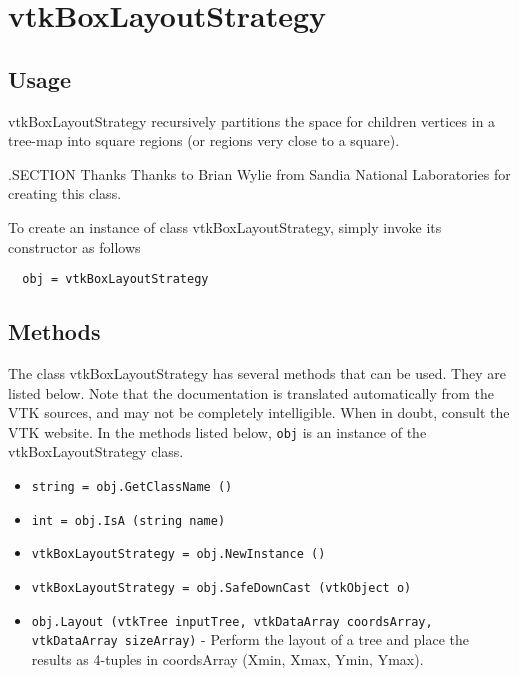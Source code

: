 \section{vtkBoxLayoutStrategy}

\subsection{Usage}

 vtkBoxLayoutStrategy recursively partitions the space for children vertices
 in a tree-map into square regions (or regions very close to a square).

 .SECTION Thanks
 Thanks to Brian Wylie from Sandia National Laboratories for creating this class.

To create an instance of class vtkBoxLayoutStrategy, simply
invoke its constructor as follows
\begin{verbatim}
  obj = vtkBoxLayoutStrategy
\end{verbatim}
\subsection{Methods}

The class vtkBoxLayoutStrategy has several methods that can be used.
  They are listed below.
Note that the documentation is translated automatically from the VTK sources,
and may not be completely intelligible.  When in doubt, consult the VTK website.
In the methods listed below, \verb|obj| is an instance of the vtkBoxLayoutStrategy class.
\begin{itemize}
\item  \verb|string = obj.GetClassName ()|

\item  \verb|int = obj.IsA (string name)|

\item  \verb|vtkBoxLayoutStrategy = obj.NewInstance ()|

\item  \verb|vtkBoxLayoutStrategy = obj.SafeDownCast (vtkObject o)|

\item  \verb|obj.Layout (vtkTree inputTree, vtkDataArray coordsArray, vtkDataArray sizeArray)| -  Perform the layout of a tree and place the results as 4-tuples in
 coordsArray (Xmin, Xmax, Ymin, Ymax).

\end{itemize}

